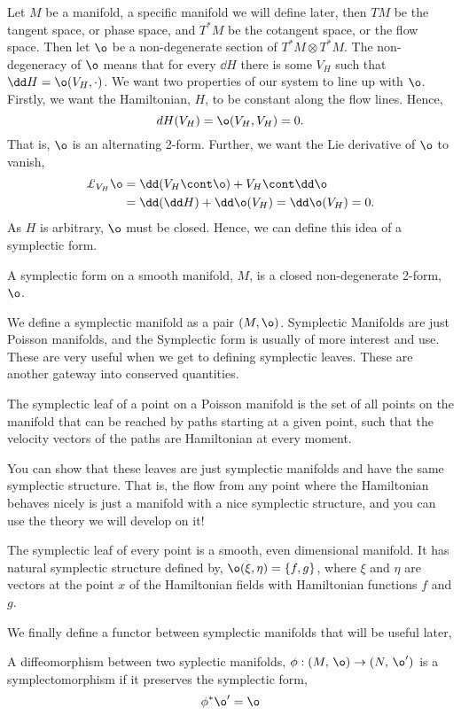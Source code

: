 \noindent
Let $M$ be a manifold, a specific manifold we will define later, then $TM$ be the tangent space, or phase space, and $T^*M$ be the cotangent space, or the flow space. Then let $\o$ be a non-degenerate section of $T^*M \otimes T^*M$. The non-degeneracy of $\o$ means that for every $\dd H$ there is some $V_H$ such that $\dd H = \o (V_H, \cdot)$. We want two properties of our system to line up with $\o$. Firstly, we want the Hamiltonian, $H$, to be constant along the flow lines. Hence,
$$ dH(V_H) = \o (V_H, V_H) = 0. $$
That is, $\o$ is an alternating 2-form. Further, we want the Lie derivative of $\o$ to vanish,
\begin{align*}
  \pounds_{V_H} \o &= \dd (V_H \cont \o) + V_H \cont \dd \o \\
  &= \dd (\dd H) + \dd \o(V_H) = \dd \o (V_H) = 0.
\end{align*}
As $H$ is arbitrary, $\o$ must be closed. Hence, we can define this idea of a symplectic form.
\begin{ndefi}
  A symplectic form on a smooth manifold, $M$, is a closed non-degenerate 2-form, $\o$.
\end{ndefi}
\noindent
We define a symplectic manifold as a pair $(M, \o)$. Symplectic Manifolds are just Poisson manifolds, and the Symplectic form is usually of more interest and use. These are very useful when we get to defining symplectic leaves. These are another gateway into conserved quantities.
\begin{ndefi}
  The symplectic leaf of a point on a Poisson manifold is the set of all points on the manifold that can be reached by paths starting at a given point, such that the velocity vectors of the paths are Hamiltonian at every moment.
\end{ndefi}
\noindent
You can show that these leaves are just symplectic manifolds and have the same symplectic structure. That is, the flow from any point where the Hamiltonian behaves nicely is just a manifold with a nice symplectic structure, and you can use the theory we will develop on it!
\begin{nthm}[]
  The symplectic leaf of every point is a smooth, even dimensional manifold. It has natural symplectic structure defined by, $\o(\xi, \eta) = \{f, g\}$, where $\xi$ and $\eta$ are vectors at the point $x$ of the Hamiltonian fields with Hamiltonian functions $f$ and $g$.
\end{nthm}
\noindent
We finally define a functor between symplectic manifolds that will be useful later,
\begin{ndefi}[Symplectomorphism]
  A diffeomorphism between two syplectic manifolds, $\phi : (M,\, \o) \to (N,\, \o')$ is a symplectomorphism if it preserves the symplectic form,
  $$ \phi^* \o' = \o $$
\end{ndefi}